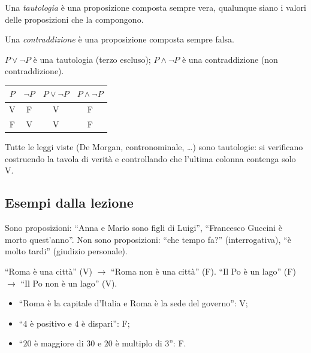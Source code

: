 \documentclass[11pt,a4paper]{article}
\newcommand{\V}{\textsf{V}}
\newcommand{\F}{\textsf{F}}
\begin{document}
\begin{definizione}
Una \emph{tautologia} è una proposizione composta sempre vera, qualunque
siano i valori delle proposizioni che la compongono.

Una \emph{contraddizione} è una proposizione composta sempre falsa.
\end{definizione}

\begin{esempio}
$P \lor \neg P$ è una tautologia (terzo escluso);
$P \land \neg P$ è una contraddizione (non contraddizione).
\begin{center}
\begin{tabular}{c|c|c|c}
$P$ & $\neg P$ & $P \lor \neg P$ & $P \land \neg P$ \\ \hline
\V & \F & \V & \F \\
\F & \V & \V & \F
\end{tabular}
\end{center}
\end{esempio}

Tutte le leggi viste (De Morgan, contronominale, \dots) sono tautologie: si
verificano costruendo la tavola di verità e controllando che l'ultima
colonna contenga solo \V.


\subsection{Esempi dalla lezione}

\begin{esempio}
Sono proposizioni: ``Anna e Mario sono figli di Luigi'', ``Francesco Guccini è morto quest'anno''. Non sono proposizioni: ``che tempo fa?'' (interrogativa), ``è molto tardi'' (giudizio personale).
\end{esempio}

\begin{esempio}[Negazione]
``Roma è una città'' (\V) $\to$ ``Roma non è una città'' (\F).
``Il Po è un lago'' (\F) $\to$ ``Il Po non è un lago'' (\V).
\end{esempio}

\begin{esempio}[Congiunzione]
\begin{itemize}
    \item ``Roma è la capitale d'Italia e Roma è la sede del governo'': \V;
    \item ``$4$ è positivo e $4$ è dispari'': \F;
    \item ``$20$ è maggiore di $30$ e $20$ è multiplo di $3$'': \F.
\end{itemize}
\end{esempio}
\end{document}
